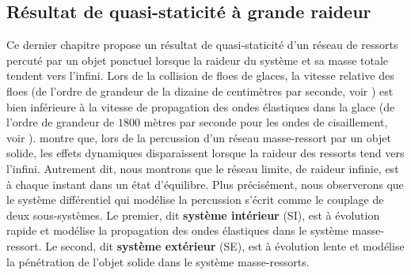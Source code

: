 \subsection{Résultat de quasi-staticité à grande raideur} 

Ce dernier chapitre propose un résultat de quasi-staticité d’un réseau de ressorts percuté par un objet ponctuel lorsque la raideur du système et sa masse totale tendent vers l’infini. Lors de la collision de floes de glaces, la vitesse relative des floes (de l’ordre de grandeur de la dizaine de centimètres par seconde, voir \parencite{rampal2009arctic}) est bien inférieure à la vitesse de propagation des ondes élastiques dans la glace (de l’ordre de grandeur de $1800$ mètres par seconde pour les ondes de cisaillement, voir \parencite{marsan2019characterizing}). \citeauthor{balasoiu2020halthesis} montre que, lors de la percussion d’un réseau masse-ressort par un objet solide, les effets dynamiques disparaissent lorsque la raideur des ressorts tend vers l’infini. Autrement dit, nous montrons que le réseau limite, de raideur infinie, est à chaque instant dans un état d’équilibre. Plus précisément, nous observerons que le système différentiel qui modélise la percussion s’écrit comme le couplage de deux sous-systèmes. Le premier, dit \textbf{système intérieur} (SI), est à évolution rapide et modélise la propagation des ondes élastiques dans le système masse-ressort. Le second, dit \textbf{système extérieur} (SE), est à évolution lente et modélise la pénétration de l’objet solide dans le système masse-ressorts.


